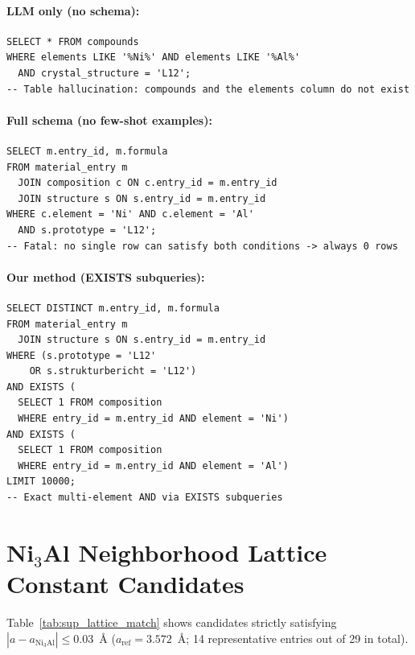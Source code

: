 \paragraph{LLM only (no schema):}
\begin{lstlisting}[basicstyle=\ttfamily\scriptsize,breaklines=true]
SELECT * FROM compounds
WHERE elements LIKE '%Ni%' AND elements LIKE '%Al%'
  AND crystal_structure = 'L12';
-- Table hallucination: compounds and the elements column do not exist
\end{lstlisting}

\paragraph{Full schema (no few-shot examples):}
\begin{lstlisting}[basicstyle=\ttfamily\scriptsize,breaklines=true]
SELECT m.entry_id, m.formula
FROM material_entry m
  JOIN composition c ON c.entry_id = m.entry_id
  JOIN structure s ON s.entry_id = m.entry_id
WHERE c.element = 'Ni' AND c.element = 'Al'
  AND s.prototype = 'L12';
-- Fatal: no single row can satisfy both conditions -> always 0 rows
\end{lstlisting}

\paragraph{Our method (EXISTS subqueries):}
\begin{lstlisting}[basicstyle=\ttfamily\scriptsize,breaklines=true]
SELECT DISTINCT m.entry_id, m.formula
FROM material_entry m
  JOIN structure s ON s.entry_id = m.entry_id
WHERE (s.prototype = 'L12'
    OR s.strukturbericht = 'L12')
AND EXISTS (
  SELECT 1 FROM composition
  WHERE entry_id = m.entry_id AND element = 'Ni')
AND EXISTS (
  SELECT 1 FROM composition
  WHERE entry_id = m.entry_id AND element = 'Al')
LIMIT 10000;
-- Exact multi-element AND via EXISTS subqueries
\end{lstlisting}


\section{Ni$_3$Al Neighborhood Lattice Constant Candidates}

\label{sec:sup_lattice_match}

Table~\ref{tab:sup_lattice_match} shows candidates strictly satisfying $|a - a_{\text{Ni}_3\text{Al}}| \leq 0.03$~\AA{}{} ($a_{\text{ref}} = 3.572$~\AA{}{}; 14 representative entries out of 29 in total).

